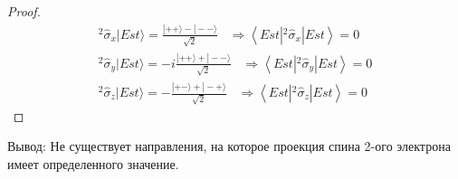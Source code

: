 \documentclass[__main__.tex]{subfiles}
\begin{document}
	\begin{proof}
		\begin{gather*}
			^2\hat{\sigma}_x|Est\rangle = \frac{|++\rangle-|--\rangle}{\sqrt{2}}\;\;\;\Rightarrow \left<Est|^2\hat{\sigma}_x|Est\right> = 0\\
			^2\hat{\sigma}_y|Est\rangle = -i\frac{|++\rangle+|--\rangle}{\sqrt{2}}\;\;\;\Rightarrow \left<Est|^2\hat{\sigma}_y|Est\right> = 0\\
			^2\hat{\sigma}_z|Est\rangle = -\frac{|+-\rangle+|-+\rangle}{\sqrt{2}}\;\;\;\Rightarrow \left<Est|^2\hat{\sigma}_z|Est\right> =  0
		\end{gather*}
	\end{proof} 
	Вывод: Не существует направления, на которое проекция спина 2-ого электрона имеет определенного значение.
\end{document}
